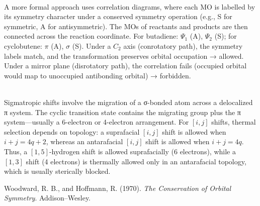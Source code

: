 \begin{technical}
\\[0.3em]
A more formal approach uses correlation diagrams, where each MO is labelled by its symmetry character under a conserved symmetry operation (e.g., S for symmetric, A for antisymmetric). The MOs of reactants and products are then connected across the reaction coordinate. For butadiene: \(\Psi_1\) (A), \(\Psi_2\) (S); for cyclobutene: \(\pi\) (A), \(\sigma\) (S). Under a \( C_2 \) axis (conrotatory path), the symmetry labels match, and the transformation preserves orbital occupation → allowed. Under a mirror plane (disrotatory path), the correlation fails (occupied orbital would map to unoccupied antibonding orbital) → forbidden.

\\[0.3em]
Sigmatropic shifts involve the migration of a σ-bonded atom across a delocalized π system. The cyclic transition state contains the migrating group plus the π system—usually a 6-electron or 4-electron arrangement. For \([i,j]\) shifts, thermal selection depends on topology: a suprafacial \([i,j]\) shift is allowed when \(i + j = 4q + 2\), whereas an antarafacial \([i,j]\) shift is allowed when \(i + j = 4q\). Thus, a \([1,5]\)-hydrogen shift is allowed suprafacially (6 electrons), while a \([1,3]\) shift (4 electrons) is thermally allowed only in an antarafacial topology, which is usually sterically blocked.

\techref
{\footnotesize
Woodward, R. B., and Hoffmann, R. (1970). \textit{The Conservation of Orbital Symmetry}. Addison–Wesley.
}
\end{technical}
